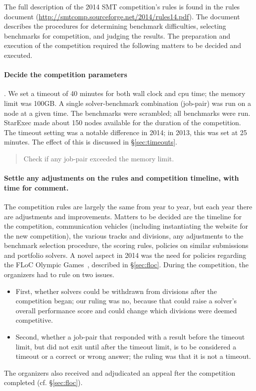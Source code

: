 \documentclass[twoside,11pt]{article}
\newcommand{\comment}[2]{\begin{quote}\sc #1\marginpar{\textcolor{red}{$\ast^{\mbox{#2}}$}}\end{quote}}
\newcommand{\davidc}[1]{\comment{#1}{DC}}
\begin{document}
The full description of the 2014 SMT competition's rules is found in the rules document (\url{http://smtcomp.sourceforge.net/2014/rules14.pdf}). The document describes the procedures for determining benchmark difficulties, selecting benchmarks for competition, and judging the results. The preparation and execution of the competition required the following matters to be decided and executed.

\paragraph{Decide the competition parameters}. We set a timeout of 40 minutes for both wall clock and cpu time; the memory limit was 100GB. A single solver-benchmark combination (job-pair) was run on a node at a given time. The benchmarks were scrambled; all benchmarks were run. StarExec made about 150 nodes available for the duration of the competition. The timeout setting was a notable difference in 2014; in 2013, this was set at 25 minutes. The effect of this is discussed in \S\ref{sec:timeouts}.

\davidc{Check if any job-pair exceeded the memory limit.}

\paragraph{Settle any adjustments on the rules and competition timeline, with time for comment.} 
The competition rules are largely the same from year to year, but each year there are adjustments and improvements. Matters to be decided are the timeline for the competition, communication vehicles (including instantiating the website for the new competition), the various tracks and divisions, any adjustments to the benchmark selection procedure, the scoring rules, policies on similar submissions and portfolio solvers. A novel aspect in 2014 was the need for policies regarding the FLoC Olympic Games~\cite{FLoCGames}, described in \S\ref{sec:floc}. During the competition, the organizers had to rule on two issues. 
\begin{itemize}[noitemsep,nolistsep]
\item First, whether solvers could be withdrawn from divisions after the competition began; our ruling was no, because that could raise a solver's overall performance score and could change which divisions were deemed competitive. 
\item Second, whether a job-pair that responded with a result before the timeout limit, but did not exit until after the timeout limit, is to be considered a timeout or a correct or wrong answer; the ruling was that it is not a timeout.
\end{itemize}
The organizers also received and adjudicated an appeal fter the competition completed (cf. \S\ref{sec:floc}).
\end{document}

